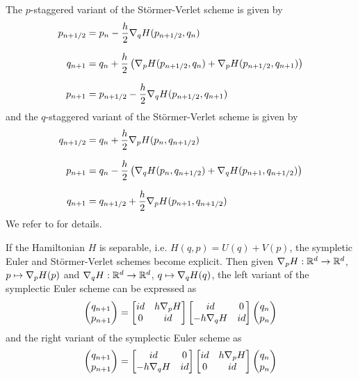 \documentclass[twoside,a4paper]{article}
\begin{document}
The $p$-staggered variant of the Störmer-Verlet scheme is given by
\begin{align*}
	p_{n+1/2} &= p_n - \frac{h}{2} \grad[q]{H}(p_{n+1/2}, q_n) \\[7pt]
	q_{n+1} &= q_n + \frac{h}{2} \lb \grad[p]{H}(p_{n+1/2}, q_n) + \grad[p]{H}(p_{n+1/2}, q_{n+1}) \rb \\[7pt]
	p_{n+1} &= p_{n+1/2} - \frac{h}{2} \grad[q]{H}(p_{n+1/2}, q_{n+1})
\end{align*}
and the $q$-staggered variant of the Störmer-Verlet scheme is given by
\begin{align*}
	q_{n+1/2} &= q_n + \frac{h}{2} \grad[p]{H}(p_n, q_{n+1/2}) \\[7pt]
	p_{n+1} &= q_n - \frac{h}{2} \lb \grad[q]{H}(p_n, q_{n+1/2}) + \grad[q]{H}(p_{n+1}, q_{n+1/2}) \rb \\[7pt]
	q_{n+1} &= q_{n+1/2} + \frac{h}{2} \grad[p]{H}(p_{n+1}, q_{n+1/2})
\end{align*}
We refer to \citet[p.~189 and p.~190]{hairer2006} for details.

If the Hamiltonian $H$ is separable, i.e. $H(q,p) = U(q) + V(p)$, the sympletic Euler and Störmer-Verlet
schemes become explicit. Then given $\grad[p]{H} : \mathbb{R}^d \to \mathbb{R}^d$, $p \mapsto \grad[p]{H}(p)$ 
and $\grad[q]{H} : \mathbb{R}^d \to \mathbb{R}^d$, $q \mapsto \grad[q]{H}(q)$,
the left variant of the symplectic Euler scheme can be expressed as
\begin{equation*}
	\begin{pmatrix}
		q_{n+1} \\
		p_{n+1}
	\end{pmatrix} =
	\begin{bmatrix}
		id & h \grad[p]{H} \\
		0 & id
	\end{bmatrix} \begin{bmatrix}
		id & 0 \\
		-h \grad[q]{H} & id
	\end{bmatrix}
	\begin{pmatrix}
		q_{n} \\
		p_{n}
	\end{pmatrix} 
\end{equation*}
and the right variant of the symplectic Euler scheme as
\begin{equation*}
	\begin{pmatrix}
		q_{n+1} \\
		p_{n+1}
	\end{pmatrix} =
	\begin{bmatrix}
		id & 0 \\
		-h \grad[q]{H} & id
	\end{bmatrix}
	\begin{bmatrix}
		id & h \grad[p]{H} \\
		0 & id
	\end{bmatrix}
	\begin{pmatrix}
		q_{n} \\
		p_{n}
	\end{pmatrix}
\end{equation*}
\end{document}
